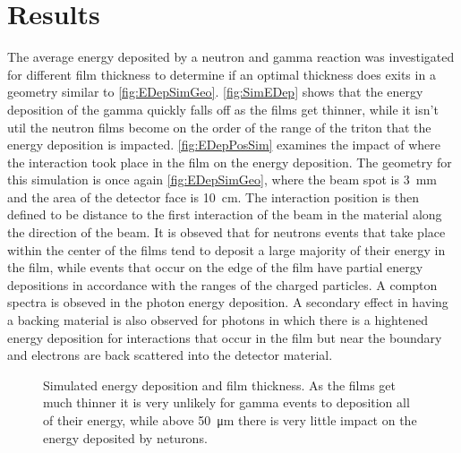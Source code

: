 \section{Results}
\label{sec:Results}

The average energy deposited by a neutron and gamma reaction was investigated for different film thickness to determine if an optimal thickness does exits in a geometry similar to \autoref{fig:EDepSimGeo}.
\autoref{fig:SimEDep} shows that the energy deposition of the gamma quickly falls off as the films get thinner, while it isn't util the neutron films become on the order of the range of the triton that the energy deposition is impacted.
\autoref{fig:EDepPosSim} examines the impact of where the interaction took place in the film on the energy deposition.
The geometry for this simulation is once again \autoref{fig:EDepSimGeo}, where the beam spot is \SI{3}{\mm} and the area of the detector face is \SI{10}{\cm}. 
The interaction position is then defined to be distance to the first interaction of the beam in the material along the direction of the beam.
It is obseved that for neutrons events that take place within the center of the films tend to deposit a large majority of their energy in the film, while events that occur on the edge of the film have partial energy depositions in accordance with the ranges of the charged particles.
A compton spectra is obseved in the photon energy deposition. 
A secondary effect in having a backing material is also observed for photons in which there is a hightened energy deposition for interactions that occur in the film but near the boundary and electrons are back scattered into the detector material.
\begin{figure}
  \centering
  \caption[Simulated Energy Deposition and Film Thickness]{Simulated energy deposition and film thickness.  As the films get much thinner it is very unlikely for gamma events to deposition all of their energy, while above \SI{50}{\um} there is very little impact on the energy deposited by neturons.}
  \label{fig:SimEDep}
\end{figure}

